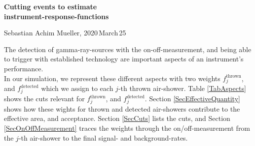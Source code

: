 \documentclass[a4paper,12pt,oneside]{article}
\begin{document}
%
\noindent
%
\LARGE
\textbf{Cutting events to estimate\\instrument-response-functions}
\normalsize\\
%
\begin{center}
Sebastian Achim Mueller, 2020\,March\,25
\end{center}
%
The detection of gamma-ray-sources with the on-off-measurement, and being able to trigger with established technology \cite{delagnes2006sam} are important aspects of an instrument's performance.\\
%
In our simulation, we represent these different aspects with two weights $f_j^\text{thrown}$, and $f_j^\text{detected}$ which we assign to each $j$-th thrown air-shower.
%
Table \ref{TabAspects} shows the cuts relevant for $f_j^\text{thrown}$, and $f_j^\text{detected}$.
%
Section \ref{SecEffectiveQuantity} shows how these wights for thrown and detected air-showers contribute to the effective area, and acceptance.
%
Section \ref{SecCuts} lists the cuts, and Section \ref{SecOnOffMeasurement} traces the weights through the on/off-measurement from the $j$-th air-shower to the final signal- and background-rates.
%
\def\True{0\,or\,1}
%
\end{document}
